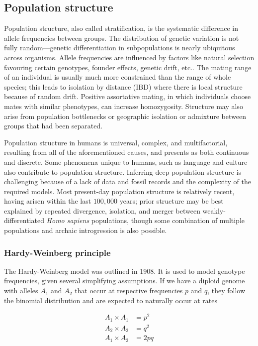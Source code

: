 \subsection{Population structure}

Population structure, also called stratification, is the systematic difference in allele frequencies between groups. The distribution of genetic variation is not fully random---genetic differentiation in subpopulations is nearly ubiquitous across organisms. Allele frequencies are influenced by factors like natural selection favouring certain genotypes, founder effects, genetic drift, etc.\citep{hartl2007principles_6}. The mating range of an individual is usually much more constrained than the range of whole species; this leads to isolation by distance (IBD) where there is local structure because of random drift\citep{wright_isolation_1943}. Positive assortative mating, in which individuals choose mates with similar phenotypes, can increase homozygosity\citep{hartl2007principles_6}. Structure may also arise from population bottlenecks or geographic isolation\citep{crow_kimura_1970_3} or admixture between groups that had been separated\citep{crow_kimura_1970_9}. 

Population structure in humans is universal, complex, and multifactorial, resulting from all of the aforementioned causes, and presents as both continuous and discrete\citep{peter_geometric_2022}. Some phenomena unique to humans, such as language\citep{barbujani_zones_1990} and culture\citep{campbell_evolution_2010} also contribute to population structure. Inferring deep population structure is challenging because of a lack of data and fossil records and the complexity of the required models. Most present-day population structure is relatively recent, having arisen within the last $100,000$ years; prior structure may be best explained by repeated divergence, isolation, and merger between weakly-differentiated \textit{Homo sapiens} populations, though some combination of multiple populations and archaic introgression is also possible\citep{ragsdale_weakly_2023}.

\subsubsection{Hardy-Weinberg principle}

The Hardy-Weinberg model was outlined in 1908. It is used to model genotype frequencies, given several simplifying assumptions\citep{hartl2007principles_2}. If we have a diploid genome with alleles $A_{1}$ and $A_{2}$ that occur at respective frequencies $p$ and $q$, they follow the binomial distribution and are expected to naturally occur at rates
\begin{spacing}{1}
\begin{align*} 
A_{1} \times A_{1} &= p^{2}\\
A_{2} \times A_{2} &= q^{2}\\
A_{1} \times A_{2} &= 2pq
\end{align*} 
\end{spacing}

